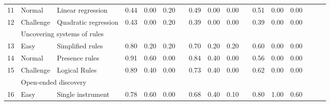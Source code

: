 \documentclass{article}
\begin{document}
\begin{table}[!t]
\begin{tabular}{lllccc c ccc c ccc ccc}
\rowcolor[HTML]{FFFFFF} 
11  & Normal & Linear regression & \cellcolor[HTML]{c89dde}0.44 & \cellcolor[HTML]{ffffff}0.00 & \cellcolor[HTML]{d5ecd5}0.20 & & \cellcolor[HTML]{c191da}0.49 & \cellcolor[HTML]{ffffff}0.00 & \cellcolor[HTML]{ffffff}0.00 & & \cellcolor[HTML]{bf8dd9}0.51 & \cellcolor[HTML]{ffffff}0.00 & \cellcolor[HTML]{ffffff}0.00 \\ 
\rowcolor[HTML]{FFFFFF} 
12  & Challenge & Quadratic regression & \cellcolor[HTML]{c99edf}0.43 & \cellcolor[HTML]{ffffff}0.00 & \cellcolor[HTML]{d5ecd5}0.20 & & \cellcolor[HTML]{cea8e2}0.39 & \cellcolor[HTML]{ffffff}0.00 & \cellcolor[HTML]{ffffff}0.00 & & \cellcolor[HTML]{cea8e2}0.39 & \cellcolor[HTML]{ffffff}0.00 & \cellcolor[HTML]{ffffff}0.00 \\ \hline
\rowcolor[HTML]{F3F3F3} 
\multicolumn{2}{l}{\textbf{Plant Nutrients}} & \multicolumn{11}{l}{Uncovering systems of rules} &  \\ 
\rowcolor[HTML]{F3F3F3} 
13  & Easy & Simplified rules & \cellcolor[HTML]{9a4cc3}0.80 & \cellcolor[HTML]{d2e4f0}0.20 & \cellcolor[HTML]{d5ecd5}0.20 & & \cellcolor[HTML]{a762ca}0.70 & \cellcolor[HTML]{d2e4f0}0.20 & \cellcolor[HTML]{d5ecd5}0.20 & & \cellcolor[HTML]{b379d2}0.60 & \cellcolor[HTML]{ffffff}0.00 & \cellcolor[HTML]{ffffff}0.00 \\ 
\rowcolor[HTML]{F3F3F3} 
14  & Normal & Presence rules & \cellcolor[HTML]{8c33bb}0.91 & \cellcolor[HTML]{79add2}0.60 & \cellcolor[HTML]{ffffff}0.00 & & \cellcolor[HTML]{9542c0}0.84 & \cellcolor[HTML]{a5c9e1}0.40 & \cellcolor[HTML]{ffffff}0.00 & & \cellcolor[HTML]{b881d5}0.56 & \cellcolor[HTML]{ffffff}0.00 & \cellcolor[HTML]{ffffff}0.00 \\ 
\rowcolor[HTML]{F3F3F3} 
15  & Challenge & Logical Rules & \cellcolor[HTML]{8f38bc}0.89 & \cellcolor[HTML]{a5c9e1}0.40 & \cellcolor[HTML]{ffffff}0.00 & & \cellcolor[HTML]{a35cc8}0.73 & \cellcolor[HTML]{a5c9e1}0.40 & \cellcolor[HTML]{ffffff}0.00 & & \cellcolor[HTML]{b174d1}0.62 & \cellcolor[HTML]{ffffff}0.00 & \cellcolor[HTML]{ffffff}0.00 \\ \hline
\rowcolor[HTML]{FFFFFF} 
\multicolumn{2}{l}{\textbf{Space Sick}} & \multicolumn{11}{l}{Open-ended discovery} &  \\ 
\rowcolor[HTML]{FFFFFF} 
16  & Easy & Single instrument & \cellcolor[HTML]{9d50c4}0.78 & \cellcolor[HTML]{79add2}0.60 & \cellcolor[HTML]{ffffff}0.00 & & \cellcolor[HTML]{a966cc}0.68 & \cellcolor[HTML]{a5c9e1}0.40 & \cellcolor[HTML]{eaf6ea}0.10 & & \cellcolor[HTML]{9a4cc3}0.80 & \cellcolor[HTML]{1f77b4}1.00 & \cellcolor[HTML]{80c680}0.60 \\ 

\end{tabular}
\end{table}
\end{document}
